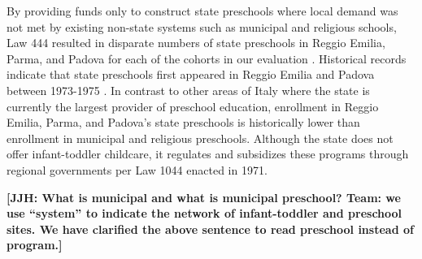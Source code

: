 By providing funds only to construct state preschools where local demand was not met by existing non-state systems such as municipal and religious schools, Law 444 resulted in disparate numbers of state preschools in Reggio Emilia, Parma, and Padova for each of the cohorts in our evaluation \citep{Hohnerlein_2009_Paradox-Public-Preschools}. Historical records indicate that state preschools first appeared in Reggio Emilia and Padova between 1973-1975 \citep{Padova-Admin-Data_1964-2011,Reggio-Admin-data_1966-2006,Reggio-Annual-Journals_1994-2011}. In contrast to other areas of Italy where the state is currently the largest provider of preschool education, enrollment in Reggio Emilia, Parma, and Padova's state preschools is historically lower than enrollment in municipal and religious preschools. Although the state does not offer infant-toddler childcare, it regulates and subsidizes these programs through regional governments per Law 1044 enacted in 1971.

\textbf{[JJH: What is municipal and what is municipal preschool? Team: we use ``system'' to indicate the network of infant-toddler and preschool sites. We have clarified the above sentence to read preschool instead of program.]}

